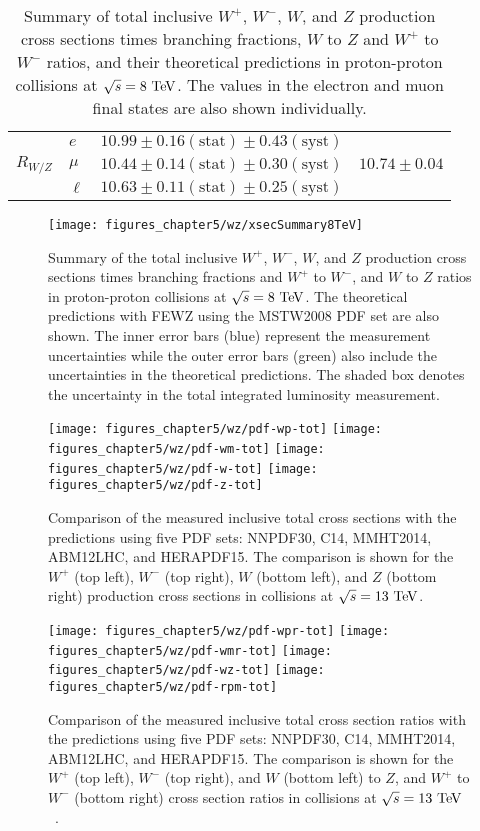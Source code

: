 \begin{table}[tbhp]
\begin {tabular} {lllr}
\hline
             & $e$   & $10.99 \pm 0.16\mathrm{(stat)}\pm 0.43\mathrm{(syst)}$ &                  \\
$R_{W/Z}$   & $\mu$ & $10.44 \pm 0.14\mathrm{(stat)}\pm 0.30\mathrm{(syst)}$ & $10.74 \pm 0.04$ \\
             & $\ell$ & $10.63 \pm 0.11\mathrm{(stat)}\pm 0.25\mathrm{(syst)}$ &  \\
\end{tabular}
\caption{ \label{tab:8tevtable}
Summary of total inclusive $W^{+}$, $W^{-}$, $W$, and $Z$ production cross sections times
branching fractions, $W$ to $Z$ and $W^{+}$ to $W^{-}$ ratios, and their theoretical predictions in proton-proton collisions at $\sqrt{s}=8~\mathrm{Te\kern -0.1em V}$. The values in the electron and muon final states are also shown individually.}
\end{table}
\begin{figure}[tbh]
\centering
\texttt{[image: figures\_chapter5/wz/xsecSummary8TeV]}
\caption{Summary of the total inclusive $W^+$, $W^-$, $W$, and $Z$ production cross sections times branching fractions and $W^+$ to $W^-$, and $W$ to $Z$ ratios in proton-proton collisions at $\sqrt{s}=8~\mathrm{Te\kern -0.1em V}$. The theoretical predictions with FEWZ using the MSTW2008 PDF set are also shown. The inner error bars (blue) represent the measurement uncertainties while the outer error bars (green) also include the uncertainties in the theoretical predictions. The shaded box denotes the uncertainty in the total integrated luminosity measurement.}
\label{fig:8tev}
\end{figure}
\begin{figure}[tbh]
\centering
\texttt{[image: figures\_chapter5/wz/pdf-wp-tot]}
\texttt{[image: figures\_chapter5/wz/pdf-wm-tot]}
\texttt{[image: figures\_chapter5/wz/pdf-w-tot]}
\texttt{[image: figures\_chapter5/wz/pdf-z-tot]}
\caption{Comparison of the measured inclusive total cross sections with the predictions using five PDF sets: NNPDF30, C14, MMHT2014, ABM12LHC, and HERAPDF15. The comparison is shown for the $W^+$ (top left), $W^-$ (top right), $W$ (bottom left), and $Z$ (bottom right) production cross sections in collisions at $\sqrt{s}=13~\mathrm{Te\kern -0.1em V}$.}
\label{fig:pdf_tot}
\end{figure}
\begin{figure}[tbh]
\centering
\texttt{[image: figures\_chapter5/wz/pdf-wpr-tot]}
\texttt{[image: figures\_chapter5/wz/pdf-wmr-tot]}
\texttt{[image: figures\_chapter5/wz/pdf-wz-tot]}
\texttt{[image: figures\_chapter5/wz/pdf-rpm-tot]}
\caption{Comparison of the measured inclusive total cross section ratios with the predictions using five PDF sets: NNPDF30, C14, MMHT2014, ABM12LHC, and HERAPDF15. The comparison is shown for the $W^+$ (top left), $W^-$ (top right), and $W$ (bottom left) to $Z$, and $W^+$ to $W^-$ (bottom right) cross section ratios in collisions at $\sqrt{s}=13~\mathrm{Te\kern -0.1em V}$~\cite{CMS-PAS-SMP-15-004}.}
\label{fig:pdf_rat}
\end{figure}

